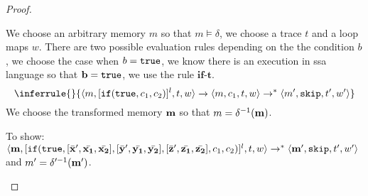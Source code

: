 \documentclass[a4paper,11pt]{article}
\begin{document}
\begin{proof}
\begin{itemize}
We choose an arbitrary memory $m$ so that $m \vDash \delta$, we choose a trace $t$ and a loop maps $w$.
There are two possible evaluation rules depending on the the condition $b$, we choose the case when $b = \mathtt{true}$, we know there is an execution in ssa language so that $\mathbf{{b}} = \mathtt{true}$, we use the rule $\textbf{if-t}$.  
 \[\inferrule
{
}
{
\config{m, [\eif(\etrue, c_1, c_2)]^{l},t,w} 
\xrightarrow{} \config{m, c_1,  t,w} \to^{*} \config{m', \eskip, t', w'}
}
\]
 We choose the transformed memory ${\mathbf{{m}}} $ so that  $ m =\delta^{-1}(\mathbf{{m}})$.
 
 To show: $\langle \mathbf{{m}}, [\mathtt{if}(\mathtt{true}, [\bar{\mathbf{{x}}}', \bar{\mathbf{{x_1}}}, \bar{\mathbf{{x_2}}}] ,[\bar{\mathbf{{y}}}', \bar{\mathbf{{y_1}}}, \bar{\mathbf{{y_2}}}] ,[\bar{\mathbf{{z}}}', \bar{\mathbf{{z_1}}}, \bar{\mathbf{{z_2}}}] , c_1, c_2)]^{l}, t, w \rangle \to^{*} \langle \mathbf{{m'}}, \mathtt{skip}, t', w' \rangle $ and $ m' = \delta'^{-1}(\mathbf{{m'}}) $.


\end{itemize}
\end{proof}
\end{document}
